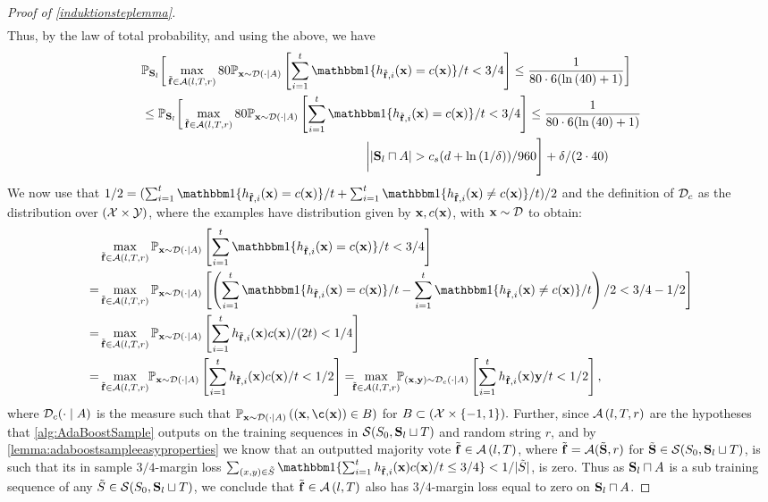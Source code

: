 \begin{proof}[Proof of \cref{induktionsteplemma}]
\begin{align*}
\end{align*}
Thus, by the law of total probability, and using the above, we have
\begin{align}\label{highprobabilityeq10}
  &\p_{\rS_{l}}\bigg[ \max_{\rf\in \cA(l,T,r)} 80\p_{\rx\sim \cD(\cdot| A)}
  \left[
  \sum_{i=1}^{t} \ind\{h_{\rf,i}(\rx)=c(\rx)\}/t< 3/4
 \right]\leq \frac{1}{80\cdot6(\ln{(\cnn )}+1)}\bigg]\nonumber\\ 
  &\leq 
  \p_{\rS_{l}}\bigg[ \max_{\rf\in \cA(l,T,r)} 80\p_{\rx\sim \cD(\cdot| A)}
  \left[
  \sum_{i=1}^{t} \ind\{h_{\rf,i}(\rx)=c(\rx)\}/t< 3/4
 \right]\leq \frac{1}{80\cdot6(\ln{(\cnn )}+1)}\nonumber\\&
 \quad\quad\quad\quad\quad\quad\quad\quad\quad\quad\quad\quad\quad\quad\quad\quad\quad\quad\bigg| |\rS_{l}\sqcap A|> \cs(d+\ln{\left(1/\delta \right)})/960 \Bigg]+ \delta/(2\cdot\cff)
\end{align}
We now use that $1/2=(\sum_{i=1}^{t} \ind\{h_{\rf,i}(\rx)=c(\rx)\}/t+\sum_{i=1}^{t} \ind\{h_{\rf,i}(\rx)\not=c(\rx)\}/t)/2$ and the definition of $ \mathcal{D}_{c} $ as the distribution over $ (\mathcal{X}\times \mathcal{Y}) $, where the examples have distribution given by $ \mathbf{x},c(\mathbf{x}) $, with  $ \mathbf{x}\sim \mathcal{D} $ to obtain:
\begin{align}\label{highprobabilityeq12}
  &\max_{\rf\in \cA(l,T,r)} \p_{\rx\sim \cD(\cdot | A)}
  \left[
  \sum_{i=1}^{t} \ind\{h_{\rf,i}(\rx)=c(\rx)\}/t< 3/4 \right] 
   \\
  =  &\max_{\rf\in \cA(l,T,r)} \p_{\rx\sim \cD(\cdot | A)}
  \left[
  \left(\sum_{i=1}^{t} \ind\{h_{\rf,i}(\rx)=c(\rx)\}/t-\sum_{i=1}^{t} \ind\{h_{\rf,i}(\rx)\not=c(\rx)\}/t\right)/2< 3/4-1/2 \right] \nonumber
  \\
  =  &\max_{\rf\in \cA(l,T,r)} \p_{\rx\sim \cD(\cdot | A)}
  \left[
  \sum_{i=1}^{t} h_{\rf,i}(\rx)c(\rx)/(2t)< 1/4 \right]\nonumber 
  \\
  =  &\max_{\rf\in \cA(l,T,r)} \negmedspace\p_{\rx\sim \cD(\cdot | A)}
  \left[
  \sum_{i=1}^{t} h_{\rf,i}(\rx)c(\rx)/t< 1/2 \right] =\negmedspace\negmedspace\max_{\rf\in \cA(l,T,r)} \negmedspace\negmedspace\p_{(\rx,\ry)\sim \cD_{c}(\cdot | A)}
  \left[
  \sum_{i=1}^{t} h_{\rf,i}(\rx)\ry/t< 1/2 \right], \nonumber
\end{align}
where $ \mathcal{D}_{c}(\cdot \mid A) $ is the measure such that $ \p_{\rx\sim \cD(\cdot\mid A)}\left((\rx,\c(\rx))\in B\right) $ for $ B\subset (\mathcal{X}\times \{  -1,1\} ).$ 
Further, since $\mathcal{A}\left(l,T,r\right)$ are the hypotheses that \cref{alg:AdaBoostSample} outputs on the training sequences in $\mathcal{S}(S_{0},\mathbf{S}_{l}\sqcup T)$ and random string $ r $,  and by \cref{lemma:adaboostsampleeasyproperties} we know that an outputted majority vote $\tilde{\mathbf{f}}\in \mathcal{A}\left(l,T\right)$, where $ \tilde{\mathbf{f}}=\mathcal{A}(\tilde{\mathbf{S}},r) $ for $ \tilde{\mathbf{S}} \in \mathcal{S}(S_{0},\mathbf{S}_{l}\sqcup T)$, is such that its in sample $ 3/4 $-margin loss   $\sum_{(x,y)\in \tilde{S}}  
\ind\{\sum_{i=1}^{t} h_{\rf,i}(\rx)c(\rx)/t\leq 3/4\} < 1/|\tilde{S}|$, is zero. Thus as $\mathbf{S}_{l}\sqcap A$ is a sub training sequence of any $ \tilde{S}\in \mathcal{S}(S_{0},\mathbf{S}_{l}\sqcup T) $, we conclude that $ \tilde{\mathbf{f}}\in  \mathcal{A}\left(l,T\right)$  also has $ 3/4 $-margin loss equal to zero on $\mathbf{S}_{l}\sqcap A$. 


\end{proof}
